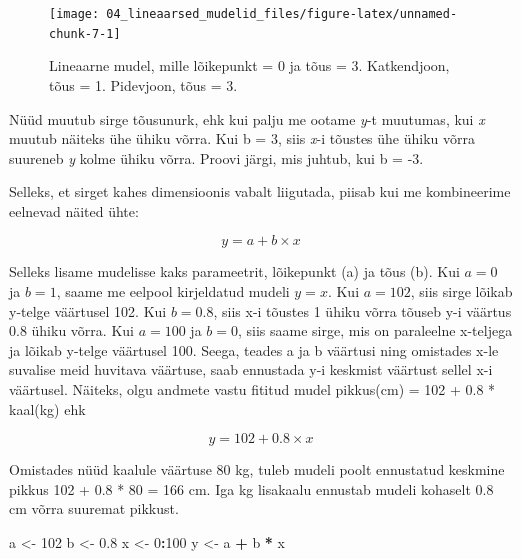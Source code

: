 \documentclass[]{book}
\newenvironment{Shaded}{\begin{snugshade}}{\end{snugshade}}
\newcommand{\KeywordTok}[1]{\textcolor[rgb]{0.13,0.29,0.53}{\textbf{#1}}}
\newcommand{\DataTypeTok}[1]{\textcolor[rgb]{0.13,0.29,0.53}{#1}}
\newcommand{\DecValTok}[1]{\textcolor[rgb]{0.00,0.00,0.81}{#1}}
\newcommand{\FloatTok}[1]{\textcolor[rgb]{0.00,0.00,0.81}{#1}}
\newcommand{\StringTok}[1]{\textcolor[rgb]{0.31,0.60,0.02}{#1}}
\newcommand{\OperatorTok}[1]{\textcolor[rgb]{0.81,0.36,0.00}{\textbf{#1}}}
\newcommand{\NormalTok}[1]{#1}
\begin{document}
\begin{figure}

{\centering \texttt{[image: 04\_lineaarsed\_mudelid\_files/figure-latex/unnamed-chunk-7-1]} 

}

\caption{Lineaarne mudel, mille lõikepunkt = 0 ja tõus = 3. Katkendjoon, tõus = 1. Pidevjoon, tõus = 3.}\label{fig:unnamed-chunk-7}
\end{figure}

Nüüd muutub sirge tõusunurk, ehk kui palju me ootame \emph{y}-t
muutumas, kui \emph{x} muutub näiteks ühe ühiku võrra. Kui b = 3, siis
\emph{x}-i tõustes ühe ühiku võrra suureneb \emph{y} kolme ühiku võrra.
Proovi järgi, mis juhtub, kui b = -3.

Selleks, et sirget kahes dimensioonis vabalt liigutada, piisab kui me
kombineerime eelnevad näited ühte:

\[y = a + b \times x\]

Selleks lisame mudelisse kaks parameetrit, lõikepunkt (a) ja tõus (b).
Kui \(a = 0\) ja \(b = 1\), saame me eelpool kirjeldatud mudeli
\(y = x\). Kui \(a = 102\), siis sirge lõikab y-telge väärtusel 102. Kui
\(b = 0.8\), siis x-i tõustes 1 ühiku võrra tõuseb y-i väärtus 0.8 ühiku
võrra. Kui \(a = 100\) ja \(b = 0\), siis saame sirge, mis on paraleelne
x-teljega ja lõikab y-telge väärtusel 100. Seega, teades a ja b väärtusi
ning omistades x-le suvalise meid huvitava väärtuse, saab ennustada y-i
keskmist väärtust sellel x-i väärtusel. Näiteks, olgu andmete vastu
fititud mudel pikkus(cm) = 102 + 0.8 * kaal(kg) ehk

\[y = 102 + 0.8 \times x\]

Omistades nüüd kaalule väärtuse 80 kg, tuleb mudeli poolt ennustatud
keskmine pikkus 102 + 0.8 * 80 = 166 cm. Iga kg lisakaalu ennustab
mudeli kohaselt 0.8 cm võrra suuremat pikkust.

\begin{Shaded}
\begin{Highlighting}[]
\NormalTok{a <-}\StringTok{ }\DecValTok{102}
\NormalTok{b <-}\StringTok{ }\FloatTok{0.8}
\NormalTok{x <-}\StringTok{  }\DecValTok{0}\OperatorTok{:}\DecValTok{100} 
\NormalTok{y <-}\StringTok{  }\NormalTok{a }\OperatorTok{+}\StringTok{ }\NormalTok{b }\OperatorTok{*}\StringTok{ }\NormalTok{x}
\end{Highlighting}
\end{Shaded}

\begin{Shaded}
\end{Shaded}
\end{document}

